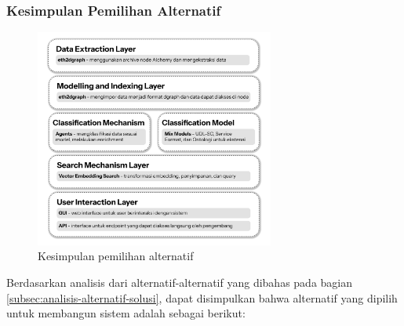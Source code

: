 \subsubsection{Kesimpulan Pemilihan Alternatif}

\begin{figure}[ht]
	\centering
	\includegraphics[width=0.7\textwidth]{resources/chapter-3/hasil-pemilihan.png}
	\caption{Kesimpulan pemilihan alternatif}
	\label{image:layer-architecture}
\end{figure}

Berdasarkan analisis dari alternatif-alternatif yang dibahas pada bagian \ref{subsec:analisis-alternatif-solusi}, dapat disimpulkan bahwa alternatif yang dipilih untuk membangun sistem adalah sebagai berikut:

